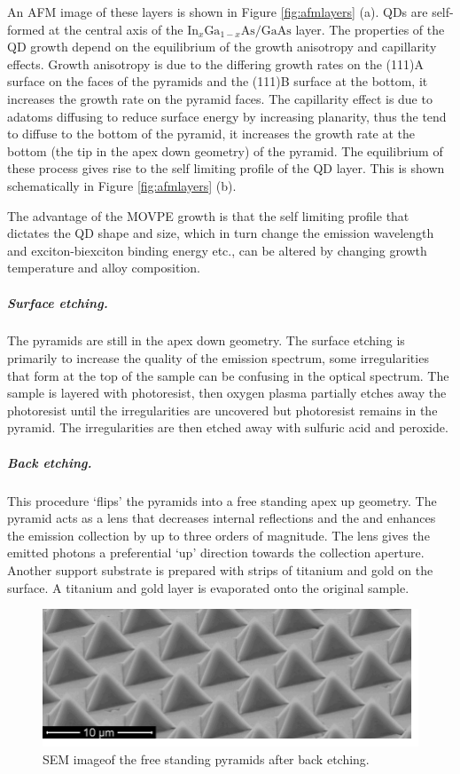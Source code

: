 \documentclass[12pt, twoside]{article}
\numberwithin{equation}{section}
\begin{document}
 An AFM image of these layers
is shown in Figure \ref{fig:afmlayers} (a). QDs are self-formed at the
central axis of the $\text{In}_x\text{Ga}_{1-x}\text{As/GaAs}$ layer.
The properties of the QD growth depend on the equilibrium of the growth
anisotropy and capillarity effects. Growth anisotropy is due to the
differing growth rates on the (111)A surface on the faces of the
pyramids and the (111)B surface at the bottom, it increases the growth
rate on the pyramid faces. The capillarity effect is due to adatoms
diffusing to reduce surface energy by increasing planarity, thus the
tend to diffuse to the bottom of the pyramid, it increases the growth
rate at the bottom (the tip in the apex down geometry) of the pyramid.
The equilibrium of these process gives rise to the self limiting profile
of the QD layer. This is shown schematically in Figure
\ref{fig:afmlayers} (b).

The advantage of the MOVPE growth is that the self limiting profile that
dictates the QD shape and size, which in turn change the emission
wavelength and exciton-biexciton binding energy etc., can be altered by
changing growth temperature and alloy composition.

\subparagraph{Surface etching.}\label{surface-etching.}

The pyramids are still in the apex down geometry. The surface etching is
primarily to increase the quality of the emission spectrum, some
irregularities that form at the top of the sample can be confusing in
the optical spectrum. The sample is layered with photoresist, then
oxygen plasma partially etches away the photoresist until the
irregularities are uncovered but photoresist remains in the pyramid. The
irregularities are then etched away with sulfuric acid and peroxide.

\subparagraph{Back etching.}\label{back-etching.}

This procedure `flips' the pyramids into a free standing apex up
geometry. The pyramid acts as a lens that decreases internal reflections
and the and enhances the emission collection by up to three orders of
magnitude. The lens gives the emitted photons a preferential `up'
direction towards the collection aperture. Another support substrate is
prepared with strips of titanium and gold on the surface. A titanium and
gold layer is evaporated onto the original sample.

\begin{figure}[h!]
    \centering
    \includegraphics[width=.5\textwidth]{images/sem.png}
    \caption{SEM image\protect\footnotemark  of the free standing pyramids after back etching.}
    \label{fig:sem}
\end{figure}
\end{document}
